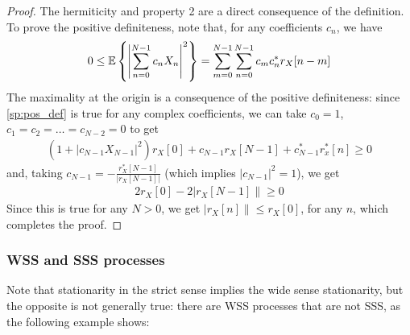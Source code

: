 \begin{proof}
The hermiticity and property 2 are a direct consequence of the definition. To prove the positive definiteness, note that, for any coefficients $c_n$, we have
\begin{align}
0 \le \mathbb{E}\left\{\left|\sum_{n=0}^{N-1} c_n X_n\right|^2 \right\}  
  =   \sum_{m=0}^{N-1}\sum_{n=0}^{N-1} c_m c_n^* r_X[n-m] 
\end{align}
The maximality at the origin is a consequence of the positive definiteness: since \eqref{sp:pos_def} is true for any complex coefficients, we can take $c_0=1$, $c_1=c_2=\ldots =c_{N-2}=0$ to get
\begin{align}
(1 + \left|c_{N-1} X_{N-1}\right|^2) r_X[0] + c_{N-1} r_X[N-1] + c_{N-1}^* r_x^*[n] \ge 0
\end{align}
and, taking $c_{N-1} = -\frac{r_X^*[N-1]}{\left|r_X[N-1]\right|}$ (which implies $\left|c_{N-1}\right|^2=1$), we get
\begin{align}
2 r_X[0] - 2 \left|r_X[N-1]\right\| \ge 0
\end{align}
Since this is true for any $N>0$, we get $\left|r_X[n] \right\| \le r_X[0]$, for any $n$, which completes the proof.
\end{proof}

\subsubsection{WSS and SSS processes}

Note that stationarity in the strict sense implies the wide sense stationarity, but the opposite is not generally true: there are WSS processes that are not SSS, as the following example shows:


